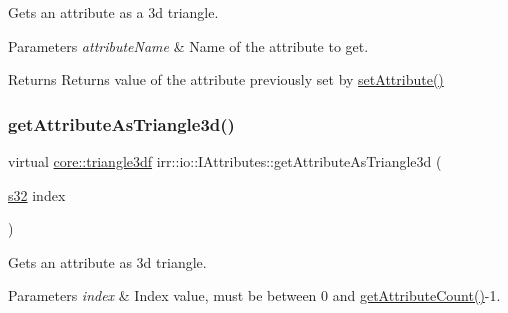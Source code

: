 Gets an attribute as a 3d triangle. 


\begin{DoxyParams}{Parameters}
{\em attribute\+Name} & Name of the attribute to get. \\
\hline
\end{DoxyParams}
\begin{DoxyReturn}{Returns}
Returns value of the attribute previously set by \hyperlink{classirr_1_1io_1_1IAttributes_a03fa31acb481ae23678676cc183f09a6}{set\+Attribute()} 
\end{DoxyReturn}
\mbox{\label{classirr_1_1io_1_1IAttributes_a75ff98c5c43f887dcaa2f1c8439d791d}} 
\subsubsection{\texorpdfstring{get\+Attribute\+As\+Triangle3d()}{getAttributeAsTriangle3d()}\hspace{0.1cm}{\footnotesize\ttfamily [3/4]}}
{\footnotesize\ttfamily virtual \hyperlink{namespaceirr_1_1core_a8983bda2678a7a67d97bf3c7be6c31c7}{core\+::triangle3df} irr\+::io\+::\+I\+Attributes\+::get\+Attribute\+As\+Triangle3d (\begin{DoxyParamCaption}\item[{\hyperlink{namespaceirr_ac66849b7a6ed16e30ebede579f9b47c6}{s32}}]{index }\end{DoxyParamCaption})\hspace{0.3cm}{\ttfamily [pure virtual]}}



Gets an attribute as 3d triangle. 


\begin{DoxyParams}{Parameters}
{\em index} & Index value, must be between 0 and \hyperlink{classirr_1_1io_1_1IAttributes_a796bdd9440ee7ba0b6742a90a82870b6}{get\+Attribute\+Count()}-\/1. \\
\hline
\end{DoxyParams}
\mbox{\label{classirr_1_1io_1_1IAttributes_a75ff98c5c43f887dcaa2f1c8439d791d}} 
